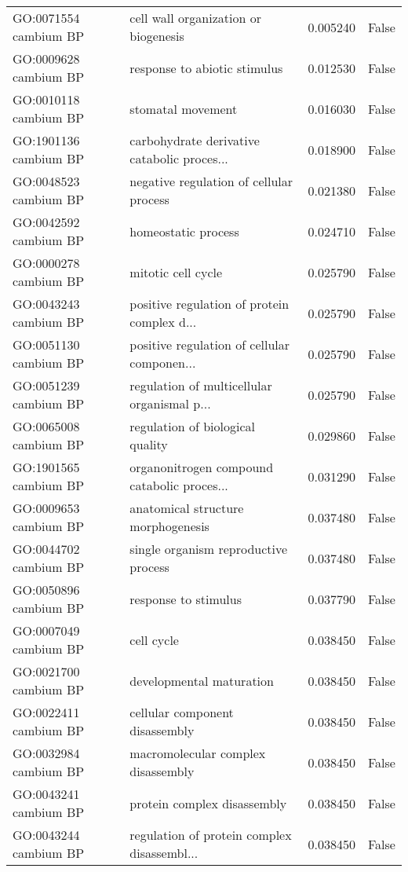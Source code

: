 \begin{tabular}{llrl}
GO:0071554 cambium BP       &  cell wall organization or biogenesis &  0.005240 &  False \\
GO:0009628 cambium BP       &  response to abiotic stimulus &  0.012530 &  False \\
GO:0010118 cambium BP       &  stomatal movement &  0.016030 &  False \\
GO:1901136 cambium BP       &  carbohydrate derivative catabolic proces... &  0.018900 &  False \\
GO:0048523 cambium BP       &  negative regulation of cellular process &  0.021380 &  False \\
GO:0042592 cambium BP       &  homeostatic process &  0.024710 &  False \\
GO:0000278 cambium BP       &  mitotic cell cycle &  0.025790 &  False \\
GO:0043243 cambium BP       &  positive regulation of protein complex d... &  0.025790 &  False \\
GO:0051130 cambium BP       &  positive regulation of cellular componen... &  0.025790 &  False \\
GO:0051239 cambium BP       &  regulation of multicellular organismal p... &  0.025790 &  False \\
GO:0065008 cambium BP       &  regulation of biological quality &  0.029860 &  False \\
GO:1901565 cambium BP       &  organonitrogen compound catabolic proces... &  0.031290 &  False \\
GO:0009653 cambium BP       &  anatomical structure morphogenesis &  0.037480 &  False \\
GO:0044702 cambium BP       &  single organism reproductive process &  0.037480 &  False \\
GO:0050896 cambium BP       &  response to stimulus &  0.037790 &  False \\
GO:0007049 cambium BP       &  cell cycle &  0.038450 &  False \\
GO:0021700 cambium BP       &  developmental maturation &  0.038450 &  False \\
GO:0022411 cambium BP       &  cellular component disassembly &  0.038450 &  False \\
GO:0032984 cambium BP       &  macromolecular complex disassembly &  0.038450 &  False \\
GO:0043241 cambium BP       &  protein complex disassembly &  0.038450 &  False \\
GO:0043244 cambium BP       &  regulation of protein complex disassembl... &  0.038450 &  False \\

\end{tabular}
